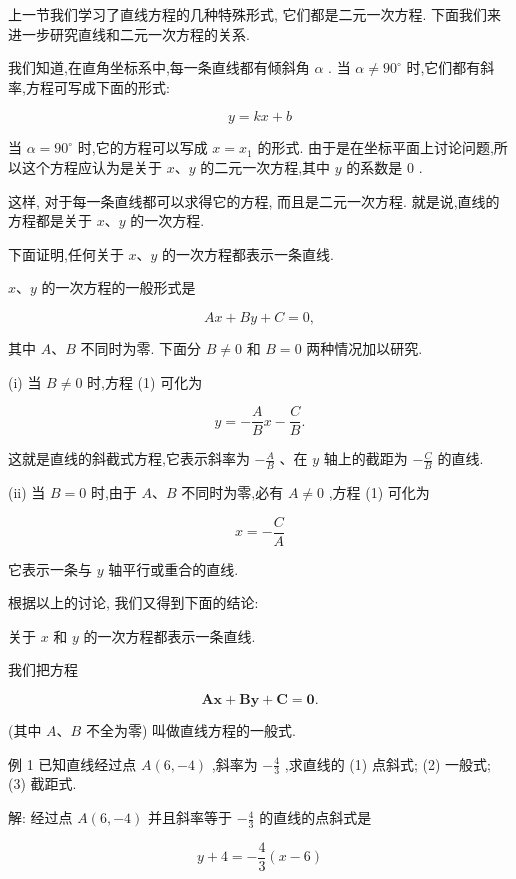 \documentclass[lang=cn,newtx,10.5pt,scheme=chinese]{elegantbook}
\begin{document}
上一节我们学习了直线方程的几种特殊形式, 它们都是二元一次方程. 下面我们来进一步研究直线和二元一次方程的关系.

我们知道,在直角坐标系中,每一条直线都有倾斜角 \(\alpha\) . 当 \(\alpha \neq {90}^{ \circ }\) 时,它们都有斜率,方程可写成下面的形式:

\[
  y = {kx} + b
\]

当 \(\alpha = {90}^{ \circ }\) 时,它的方程可以写成 \(x = {x}_{1}\) 的形式. 由于是在坐标平面上讨论问题,所以这个方程应认为是关于 \(x\text{、}y\) 的二元一次方程,其中 \(y\) 的系数是 0 .

这样, 对于每一条直线都可以求得它的方程, 而且是二元一次方程. 就是说,直线的方程都是关于 \(x\text{、}y\) 的一次方程.
\begin{corollary}[直线方程的一般形式]
下面证明,任何关于 \(x\text{、}y\) 的一次方程都表示一条直线.

\(x\text{、}y\) 的一次方程的一般形式是

\[
    {Ax} + {By} + C = 0, \tag{1}
\]
\end{corollary}
其中 \(A\text{、}B\) 不同时为零. 下面分 \(B \neq 0\) 和 \(B = 0\) 两种情况加以研究.

(i) 当 \(B \neq 0\) 时,方程 (1) 可化为

\[
  y = - \frac{A}{B}x - \frac{C}{B}.
\]

这就是直线的斜截式方程,它表示斜率为 \(- \frac{A}{B}\) 、在 \(y\) 轴上的截距为 \(- \frac{C}{B}\) 的直线.

(ii) 当 \(B = 0\) 时,由于 \(A\text{、}B\) 不同时为零,必有 \(A \neq 0\) ,方程 (1) 可化为

\[
  x = - \frac{C}{A}
\]

它表示一条与 \(y\) 轴平行或重合的直线.

根据以上的讨论, 我们又得到下面的结论:

关于 \(x\) 和 \(y\) 的一次方程都表示一条直线.

我们把方程

\[
  \mathbf{A}\mathbf{x} + \mathbf{B}\mathbf{y} + \mathbf{C} = \mathbf{0}. \tag{1}
\]

(其中 \(A\text{、}B\) 不全为零) 叫做直线方程的一般式.

例 1 已知直线经过点 \(A\left( {6, - 4}\right)\) ,斜率为 \(- \frac{4}{3}\) ,求直线的 (1) 点斜式; (2) 一般式; (3) 截距式.

解: 经过点 \(A\left( {6, - 4}\right)\) 并且斜率等于 \(- \frac{4}{3}\) 的直线的点斜式是

\[
  y + 4 = - \frac{4}{3}\left( {x - 6}\right)
\]
\end{document}
